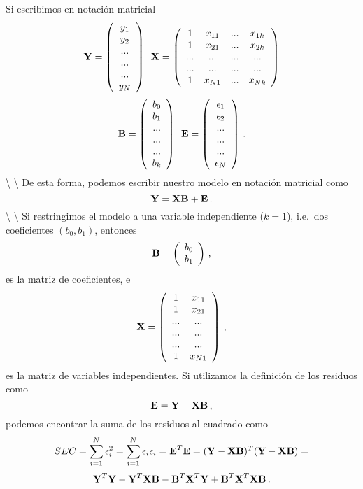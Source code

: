 \documentclass[
]{agujournal2019}
\begin{document}
\noindent Si escribimos en notación matricial
\[{\textbf Y}=\left(\begin{array}{c}
  y_1\\
  y_2\\
  ...\\
  ...\\
  ...\\
  y_N
      \end{array}\right)\,\,\,{\textbf X}=\left(\begin{array}{cccc}
  1 & x_{11} & ... & x_{1k}\\
  1 & x_{21} & ... & x_{2k}\\
  ... & ... & ... & ...\\
  ... & ... & ... & ...\\
  1 & x_{N1} & ... & x_{Nk}\\
      \end{array}\right)\] \[{\textbf B}=\left(\begin{array}{c}
  b_0\\
  b_1\\
  ...\\
  ...\\
  ...\\
  b_k
      \end{array}\right)\,\,\,{\textbf E}=\left(\begin{array}{c}
  \epsilon_1\\
  \epsilon_2\\
  ...\\
  ...\\
  ...\\
  \epsilon_N
      \end{array}\right)\,.\] \textbackslash{} \textbackslash{}
\noindent De esta forma, podemos escribir nuestro modelo en notación
matricial como \[{\textbf Y}={\textbf X}{\textbf B} + {\textbf E}\,.\]
\textbackslash{} \textbackslash{} \noindent Si restringimos el modelo a
una variable independiente (\(k=1\)), i.e.~dos coeficientes
\((b_0, b_1)\), entonces \[{\textbf B}=\left(\begin{array}{c}
  b_0\\
  b_1\\
      \end{array}\right)\,,\] es la matriz de coeficientes, e
\[{\textbf X}=\left(\begin{array}{cc}
  1& x_{11}\\
  1& x_{21}\\
  ... & ...\\
  ... & ...\\
   ... & ...\\
 1 & x_{N1}
 \end{array}\right)\,,\] es la matriz de variables independientes. Si
utilizamos la definición de los residuos como
\[{\textbf E}={\textbf Y}-{\textbf X}{\textbf B}\,,\] podemos encontrar
la suma de los residuos al cuadrado como
\[SEC=\sum^N_{i=1} \epsilon^2_i=\sum^N_{i=1} \epsilon_i \epsilon_i=
{\textbf E}^T{\textbf E}=({\textbf Y}-{\textbf X}{\textbf B})^T({\textbf Y}-{\textbf X}{\textbf B})=\]
\[{\textbf Y}^T{\textbf Y} - {\textbf Y}^T{\textbf X}{\textbf B}-{\textbf B}^T{\textbf X}^T{\textbf Y}+{\textbf B}^T
{\textbf X}^T{\textbf X}{\textbf B}\,.\]
\end{document}
